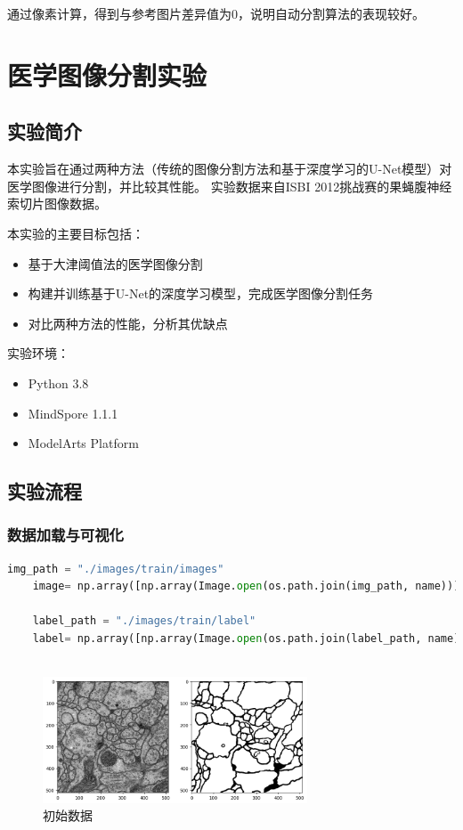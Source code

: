 \documentclass[12pt]{ctexart}
\begin{document}
通过像素计算，得到与参考图片差异值为0，说明自动分割算法的表现较好。

\newpage

\section*{医学图像分割实验}

\subsection*{实验简介}

本实验旨在通过两种方法（传统的图像分割方法和基于深度学习的U-Net模型）对医学图像进行分割，并比较其性能。
实验数据来自ISBI 2012挑战赛的果蝇腹神经索切片图像数据。

本实验的主要目标包括：
\begin{itemize}
    \item 基于大津阈值法的医学图像分割
    \item 构建并训练基于U-Net的深度学习模型，完成医学图像分割任务
    \item 对比两种方法的性能，分析其优缺点
\end{itemize}

实验环境：
\begin{itemize}
    \item Python 3.8
    \item MindSpore 1.1.1
    \item ModelArts Platform
\end{itemize}

\subsection*{实验流程}

\subsubsection*{数据加载与可视化}
\begin{lstlisting}[language=Python]
    img_path = "./images/train/images"
    image= np.array([np.array(Image.open(os.path.join(img_path, name))) for name in os.listdir(img_path)])
    
    label_path = "./images/train/label"
    label= np.array([np.array(Image.open(os.path.join(label_path, name))) for name in os.listdir(label_path)])
    
\end{lstlisting}

\begin{figure}[H]
    \centering
    \includegraphics[width=0.7\textwidth]{image/output.png}
    \caption{初始数据}
\end{figure}
\end{document}
